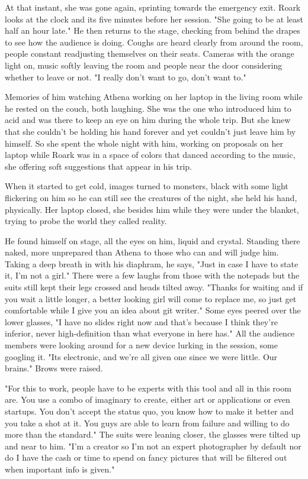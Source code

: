         At that instant, she was gone again, sprinting towards the emergency exit. Roark looks at the clock and its five minutes before her
    session. "She going to be at least half an hour late." He then returns to the stage, checking from behind the drapes to see how the audience
    is doing. Coughs are heard clearly from around the room, people constant readjusting themselves on their seats. Cameras with the orange light
    on, music softly leaving the room and people near the door considering whether to leave or not. "I really don't want to go, don't want to."
    
        Memories of him watching Athena working on her laptop in the living room while he rested on the couch, both laughing. She was the one
    who introduced him to acid and was there to keep an eye on him during the whole trip. But she knew that she couldn't be holding his hand
    forever and yet couldn't just leave him by himself. So she spent the whole night with him, working on proposals on her laptop while Roark
    was in a space of colors that danced according to the music, she offering soft suggestions that appear in his trip. 

        When it started to get cold, images turned to monsters, black with some light flickering on him so he can still see the creatures of
    the night, she held his hand, physically. Her laptop closed, she besides him while they were under the blanket, trying to probe the 
    world they called reality.

        He found himself on stage, all the eyes on him, liquid and crystal. Standing there naked, more unprepared than Athena to those who can
    and will judge him. Taking a deep breath in with his diaphram, he says, "Just in case I have to state it, I'm not a girl." There were a few
    laughs from those with the notepads but the suits still kept their legs crossed and heads tilted away. "Thanks for waiting and if you wait
    a little longer, a better looking girl will come to replace me, so just get comfortable while I give you an idea about git writer." Some eyes
    peered over the lower glasses, "I have no slides right now and that's because I think they're inferior, never high-definition than what
    everyone in here has." All the audience members were looking around for a new device lurking in the session, some googling it. "Its electronic,
    and we're all given one since we were little. Our brains." Brows were raised.

        "For this to work, people have to be experts with this tool and all in this room are. You use a combo of imaginary to create, either art
    or applications or even startups. You don't accept the status quo, you know how to make it better and you take a shot at it. You guys are
    able to learn from failure and willing to do more than the standard." The suits were leaning closer, the glasses were tilted up and near to
    him. "I'm a creator so I'm not an expert photographer by default nor do I have the cash or time to spend on fancy pictures that will be
    filtered out when important info is given."

